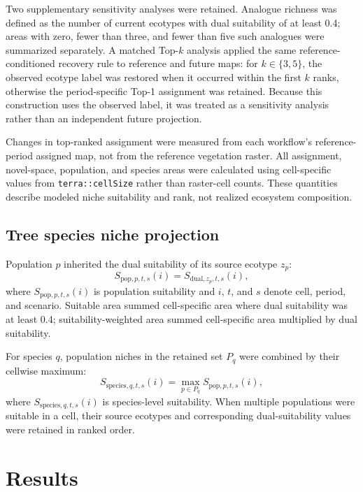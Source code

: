 \documentclass[11pt]{article}
\begin{document}
Two supplementary sensitivity analyses were retained. Analogue richness was
defined as the number of current ecotypes with dual suitability of at least
0.4; areas with zero, fewer than three, and fewer than five such analogues were
summarized separately. A matched Top-$k$ analysis applied the same
reference-conditioned recovery rule to reference and future maps: for
$k\in\{3,5\}$, the observed ecotype label was restored when it occurred within
the first $k$ ranks, otherwise the period-specific Top-1 assignment was
retained. Because this construction uses the observed label, it was treated as
a sensitivity analysis rather than an independent future projection.

Changes in top-ranked assignment were measured from each workflow's
reference-period assigned map, not from the reference vegetation raster. All
assignment, novel-space, population, and species areas were calculated using
cell-specific values from \texttt{terra::cellSize} rather than raster-cell
counts. These quantities describe modeled niche suitability and rank, not
realized ecosystem composition.


\subsection{Tree species niche projection}

Population $p$ inherited the dual suitability of its source ecotype $z_p$:
\begin{equation}
S_{\mathrm{pop},p,t,s}(i)=S_{\mathrm{dual},z_p,t,s}(i),
\end{equation}
where $S_{\mathrm{pop},p,t,s}(i)$ is population suitability and $i$, $t$, and $s$ denote cell, period, and scenario. Suitable area summed cell-specific area where dual suitability was at least 0.4; suitability-weighted area summed cell-specific area multiplied by dual suitability.

For species $q$, population niches in the retained set $P_q$ were combined by their cellwise maximum:
\begin{equation}
S_{\mathrm{species},q,t,s}(i)=\max_{p\in P_q}S_{\mathrm{pop},p,t,s}(i),
\end{equation}
where $S_{\mathrm{species},q,t,s}(i)$ is species-level suitability. When multiple populations were suitable in a cell, their source ecotypes and corresponding dual-suitability values were retained in ranked order.



\section{Results}
\end{document}
